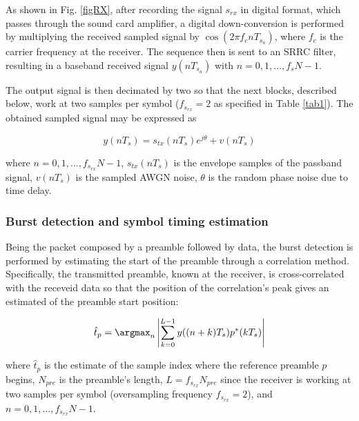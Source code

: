 As shown in Fig. \ref{figRX}, after recording the signal $s_{rx}$ in digital format, which passes through the sound card amplifier, a digital down-conversion is performed by multiplying the received sampled signal by $\cos (2 \pi f_{c} n T_{s_a})$, where $f_{c}$ is the carrier frequency at the receiver. The sequence then is sent to an SRRC filter, resulting in a baseband received signal $y(nT_{s_a})$ with $n=0,1,...,f_sN-1$. 

The output signal is then decimated by two so that the next blocks, described below, work at two samples per symbol ($f_{s_{rx}}=2$ as specified in Table \ref{tab1}). The obtained sampled signal may be expressed as

\begin{equation}
y(nT_s)=s_{tx}(nT_s) e^{j\theta}+v(nT_s)
\end{equation}

where $n=0,1,...,f_{s_{rx}}N-1$, $s_{tx}(nT_s)$ is the envelope samples of the passband signal, $v(nT_s)$ is the sampled AWGN noise, $\theta$ is the random phase noise due to time delay. 

\subsubsection{Burst detection and symbol timing estimation}

Being the packet composed by a preamble followed by data, the burst detection is performed by estimating the start of the preamble through a correlation method.
Specifically, the transmitted preamble, known at the receiver, is cross-correlated with the receveid data so that the position of the correlation's peak gives an estimated of the preamble start position:

\begin{equation}
\hat{t}_{p}= \argmax_n \left| \sum_{k=0}^{L-1}y((n+k)T_s)p^*(kT_s)\right| 
\label{eq_delay}
\end{equation}

where $\hat{t}_{p}$ is the estimate of the sample index where the reference preamble $p$ begins, $N_{pre}$ is the preamble's length, $L=f_{s_{rx}}N_{pre}$ 
since the receiver is working at two samples per symbol (oversampling frequency $f_{s_{rx}}=2$), and $n= 0, 1,...,f_{s_{rx}}N-1$.


